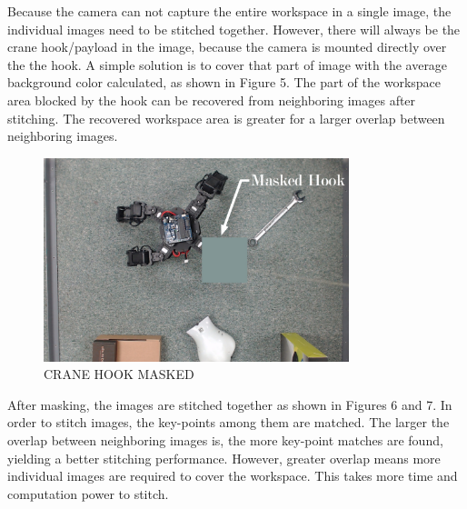 \documentclass[twocolumn,10pt]{asme2e}
\begin{document}

Because the camera can not capture the entire workspace in a single image, the individual images need to be stitched together. However, there will always be the crane hook/payload in the image, because the camera is mounted directly over the the hook. A simple solution is to cover that part of image with the average background color calculated, as shown in Figure 5. The part of the workspace area blocked by the hook can be recovered from neighboring images after stitching. The recovered workspace area is greater for a larger overlap between neighboring images.


\begin{figure}[tb]
\begin{center}
\includegraphics[width=3.5in]{masked}
\caption{CRANE HOOK MASKED}
\label{default}
\end{center}
\end{figure}

After masking, the images are stitched together as shown in Figures 6 and 7. In order to stitch images, the key-points among them are matched. The larger the overlap between neighboring images is, the more key-point matches are found, yielding a better stitching performance. However, greater overlap means more individual images are required to cover the workspace. This takes more time and computation power to stitch.
\end{document}
